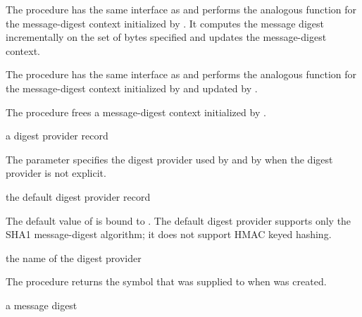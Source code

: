 The  procedure has the same interface as  and
performs the analogous function for the message-digest context initialized by
. It computes the message digest incrementally on the set of bytes
specified and updates the message-digest context.

The  procedure has the same interface as  and
performs the analogous function for the message-digest context initialized by
 and updated by .

The  procedure frees a message-digest context initialized
by .

\begin{parameter}
\end{parameter}
\returns{} a digest provider record

The  parameter specifies the digest provider
used by  and by  when the
digest provider is not explicit.

\begin{binding}
\end{binding}
\returns{} the default digest provider record

The default value of  is bound to
.
The default digest provider supports only the SHA1 message-digest algorithm;
it does not support HMAC keyed hashing.

\begin{procedure}
\end{procedure}
\returns{} the name of the digest provider

The  procedure returns the symbol
that was supplied to  when 
was created.

\begin{procedure}
\end{procedure}
\returns{} a message digest

